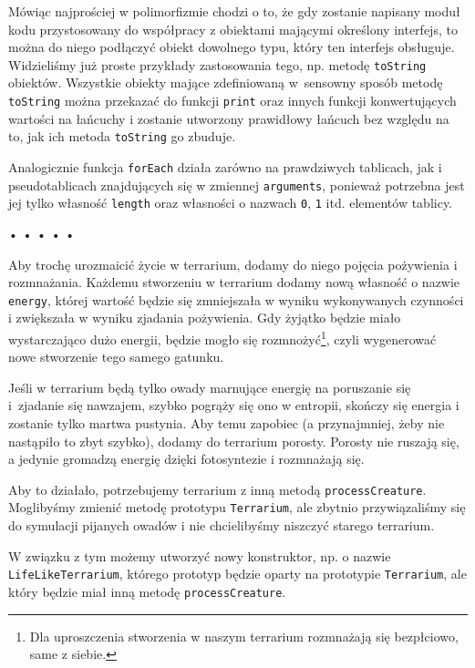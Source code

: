   
Mówiąc najprościej w polimorfizmie chodzi o to, że gdy zostanie napisany moduł kodu przystosowany do współpracy z obiektami mającymi określony interfejs, to można do niego podłączyć obiekt dowolnego typu, który ten interfejs obsługuje. Widzieliśmy już proste przykłady zastosowania tego, np. metodę \texttt{toString} obiektów. Wszystkie obiekty mające zdefiniowaną w~sensowny sposób metodę \texttt{toString} można przekazać do funkcji \texttt{print} oraz innych funkcji konwertujących wartości na łańcuchy i zostanie utworzony prawidłowy łańcuch bez względu na to, jak ich metoda \texttt{toString} go zbuduje.

  
Analogicznie funkcja \texttt{forEach} działa zarówno na prawdziwych tablicach, jak i pseudotablicach znajdujących się w zmiennej \texttt{arguments}, ponieważ potrzebna jest jej tylko własność \texttt{length} oraz własności o nazwach \texttt{0}, \texttt{1} itd. elementów tablicy.



\begin{center}
• • • • •
\end{center}

  
Aby trochę urozmaicić życie w terrarium, dodamy do niego pojęcia pożywienia i rozmnażania. Każdemu stworzeniu w terrarium dodamy nową własność o nazwie \texttt{energy}, której wartość będzie się zmniejszała w wyniku wykonywanych czynności i zwiększała w wyniku zjadania pożywienia. Gdy żyjątko będzie miało wystarczająco dużo energii, będzie mogło się rozmnożyć\footnote{Dla uproszczenia stworzenia w naszym terrarium rozmnażają się bezpłciowo, same z siebie.}, czyli wygenerować nowe stworzenie tego samego gatunku.

  
Jeśli w terrarium będą tylko owady marnujące energię na poruszanie się i~zjadanie się nawzajem, szybko pogrąży się ono w entropii, skończy się energia i zostanie tylko martwa pustynia. Aby temu zapobiec (a przynajmniej, żeby nie nastąpiło to zbyt szybko), dodamy do terrarium porosty. Porosty nie ruszają się, a jedynie gromadzą energię dzięki fotosyntezie i rozmnażają się.

  
Aby to działało, potrzebujemy terrarium z inną metodą \texttt{processCreature}. Moglibyśmy zmienić metodę prototypu \texttt{Terrarium}, ale zbytnio przywiązaliśmy się do symulacji pijanych owadów i nie chcielibyśmy niszczyć starego terrarium.

  
W związku z tym możemy utworzyć nowy konstruktor, np. o nazwie \texttt{LifeLikeTerrarium}, którego prototyp będzie oparty na prototypie \texttt{Terrarium}, ale który będzie miał inną metodę \texttt{processCreature}.



